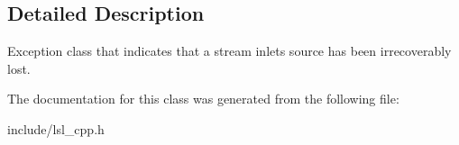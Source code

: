 \subsection{Detailed Description}
Exception class that indicates that a stream inlet\textquotesingle{}s source has been irrecoverably lost. 

The documentation for this class was generated from the following file\+:\begin{DoxyCompactItemize}
\item 
include/lsl\+\_\+cpp.\+h\end{DoxyCompactItemize}
